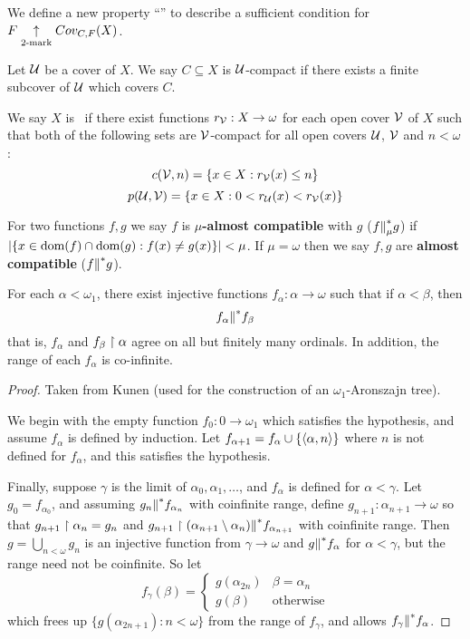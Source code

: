   We define a new property ``\scish'' to describe a sufficient condition for $F \underset{2\text{-mark}}{\uparrow}Cov_{C,F}(X)$.

  \begin{definition}
    Let $\mathcal{U}$ be a cover of $X$. We say $C\subseteq X$ is $\mathcal{U}$-compact if there exists a finite subcover of $\mathcal{U}$ which covers $C$.

    We say $X$ is \scish~if there exist functions $r_{\mathcal{V}}:X\to\omega$ for each open cover $\mathcal{V}$ of $X$ such that both of the following sets are $\mathcal{V}$-compact for all open covers $\mathcal{U}$, $\mathcal{V}$ and $n<\omega$:
      \[
        c(\mathcal{V},n)=\{ x\in X : r_{\mathcal{V}}(x)\leq n\}
      \]
      \[
        p(\mathcal{U},\mathcal{V})=\{ x\in X : 0<r_{\mathcal{U}}(x)<r_{\mathcal{V}}(x)\}
      \]
  \end{definition}

  \begin{definition}
    For two functions $f,g$ we say $f$ is \textbf{$\mu$-almost compatible} with $g$ ($f{\parallel}^*_\mu g$) if $|\{x\in\textrm{dom}(f)\cap\textrm{dom}(g):f(x)\not=g(x)\}|<\mu$. If $\mu=\omega$ then we say $f,g$ are \textbf{almost compatible} ($f{\parallel}^* g$).
  \end{definition}

  \begin{lemma}\label{kunlem}
    For each $\alpha<\omega_1$, there exist injective functions $f_\alpha:\alpha\to\omega$ such that if $\alpha<\beta$, then \[f_\alpha {\parallel}^* f_\beta\] that is, $f_\alpha$ and $f_\beta\restriction\alpha$ agree on all but finitely many ordinals. In addition, the range of each $f_\alpha$ is co-infinite.
  \end{lemma}

  \begin{proof}
    Taken from Kunen (used for the construction of an $\omega_1$-Aronszajn tree).

    We begin with the empty function $f_0:0\to\omega_1$ which satisfies the hypothesis, and assume $f_\alpha$ is defined by induction. Let $f_{\alpha+1} = f_\alpha \cup \{\langle\alpha,n\rangle\}$ where $n$ is not defined for $f_\alpha$, and this satisfies the hypothesis.

    Finally, suppose $\gamma$ is the limit of $\alpha_0,\alpha_1,\dots$, and $f_\alpha$ is defined for $\alpha<\gamma$. Let $g_0=f_{\alpha_0}$, and assuming $g_n{\parallel}^* f_{\alpha_n}$ with coinfinite range, define $g_{n+1}:\alpha_{n+1}\to\omega$ so that $g_{n+1}\restriction\alpha_n=g_n$ and $g_{n+1}\restriction(\alpha_{n+1}\setminus\alpha_n){\parallel}^* f_{\alpha_{n+1}}$ with coinfinite range. Then $g=\bigcup_{n<\omega} g_n$ is an injective function from $\gamma \to \omega$ and $g {\parallel}^* f_\alpha$ for $\alpha <\gamma$, but the range need not be coinfinite. So let
    \[
      f_\gamma(\beta) = \left\{
      \begin{array}{ll}
        g(\alpha_{2n}) & \beta = \alpha_n \\
        g(\beta) & \text{otherwise}
      \end{array}
      \right.
    \]
    which frees up $\{g(\alpha_{2n+1}):n<\omega\}$ from the range of $f_\gamma$, and allows $f_\gamma{\parallel}^* f_\alpha$.
  \end{proof}

